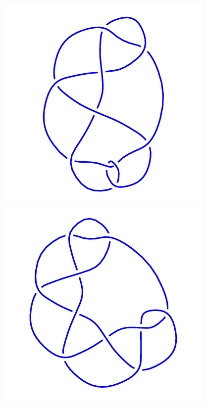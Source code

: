 \begin{figure}[H]
\begin{minipage}[b]{.18\linewidth}
    \end{minipage}
    \begin{minipage}[b]{.18\linewidth}
        \centering
        \includegraphics[width=\linewidth]{../data/10_44.png}
    \end{minipage}
    \begin{minipage}[b]{.18\linewidth}
        \centering
        \includegraphics[width=\linewidth]{../data/10_45.png}

\end{minipage}
\end{figure}
